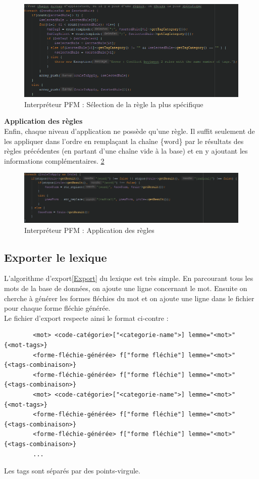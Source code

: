 \documentclass[12pt,a4paper]{article}
\begin{document}
    \begin{figure}[h]
        \centering
        \includegraphics[width=150mm]{img/interpreteur_selection.PNG}
        \caption{Interpréteur PFM : Sélection de la règle la plus spécifique}
        \label{PFM5}
    \end{figure}

    \textbf{Application des règles} \\
    Enfin, chaque niveau d'application ne possède qu'une règle. Il suffit seulement de les appliquer dans l'ordre en remplaçant la chaîne \{word\} par le résultats des règles précédentes (en partant d'une chaîne vide à la base) et en y ajoutant les informations complémentaires. \ref{PFM6}

    \begin{figure}[h]
        \centering
        \includegraphics[width=150mm]{img/interpreteur_application.PNG}
        \caption{Interpréteur PFM : Application des règles}
        \label{PFM6}
    \end{figure}


    \subsection{Exporter le lexique}

    L'algorithme d'export\ref{Export} du lexique est très simple. En parcourant tous les mots de la base de données, on ajoute une ligne concernant le mot. Ensuite on cherche à générer les formes fléchies du mot et on ajoute une ligne dans le fichier pour chaque forme fléchie générée. \\
    Le fichier d'export respecte ainsi le format ci-contre :
    \begin{verbatim}
        <mot> <code-catégorie>["<categorie-name">] lemme="<mot>" {<mot-tags>}
        <forme-fléchie-générée> f["forme fléchie"] lemme="<mot>" {<tags-combinaison>}
        <forme-fléchie-générée> f["forme fléchie"] lemme="<mot>" {<tags-combinaison>}
        <mot> <code-catégorie>["<categorie-name">] lemme="<mot>" {<mot-tags>}
        <forme-fléchie-générée> f["forme fléchie"] lemme="<mot>" {<tags-combinaison>}
        <forme-fléchie-générée> f["forme fléchie"] lemme="<mot>" {<tags-combinaison>}
        ...
    \end{verbatim}
    Les tags sont séparés par des points-virgule.
\end{document}
